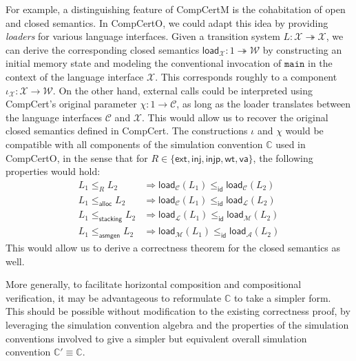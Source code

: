 \documentclass[11pt,oneside]{book}
\theoremstyle{definition}
\newcommand{\kw}[1]{\ensuremath{ \mathsf{#1} }}
\begin{document}
For example,
a distinguishing feature of CompCertM
is the cohabitation of open and closed semantics.
In CompCertO,
we could adapt this idea by providing
\emph{loaders} for various language interfaces.
Given a transition system $L : \mathcal{X} \twoheadrightarrow \mathcal{X}$,
we can derive the corresponding closed semantics
$\kw{load}_\mathcal{X} : 1 \twoheadrightarrow \mathcal{W}$
by constructing an initial memory state
and modeling the conventional invocation of $\texttt{main}$
in the context of the language interface $\mathcal{X}$.
This corresponds roughly to a component
$\iota_\mathcal{X} : \mathcal{X} \rightarrow \mathcal{W}$.
On the other hand,
external calls could be interpreted using
CompCert's original parameter
$\chi : 1 \rightarrow \mathcal{C}$,
as long as the loader translates
between the language interfaces $\mathcal{C}$ and $\mathcal{X}$.
This would allow us to recover
the original closed semantics defined in CompCert.
The constructions $\iota$ and $\chi$ would be compatible
with all components of the simulation convention $\mathbb{C}$
used in CompCertO,
in the sense that
for $R \in \{ \kw{ext}, \kw{inj}, \kw{injp}, \kw{wt}, \kw{va} \}$,
the following properties would hold:
\begin{align*}
  L_1 \le_R L_2 &\Rightarrow
    \kw{load}_\mathcal{C}(L_1) \le_\kw{id} \kw{load}_\mathcal{C}(L_2) \\
  L_1 \le_\kw{alloc} L_2 &\Rightarrow
    \kw{load}_\mathcal{C}(L_1) \le_\kw{id} \kw{load}_\mathcal{L}(L_2) \\
  L_1 \le_\kw{stacking} L_2 &\Rightarrow
    \kw{load}_\mathcal{L}(L_1) \le_\kw{id} \kw{load}_\mathcal{M}(L_2) \\
  L_1 \le_\kw{asmgen} L_2 &\Rightarrow
    \kw{load}_\mathcal{M}(L_1) \le_\kw{id} \kw{load}_\mathcal{A}(L_2)
\end{align*}
This would allow us to derive a correctness theorem
for the closed semantics as well.

More generally,
to facilitate horizontal composition
and compositional verification,
it may be advantageous to reformulate
$\mathbb{C}$
to take a simpler form.
This should be possible without
modification to the existing correctness proof,
by leveraging the simulation convention algebra
and the properties of the simulation conventions involved
to give a simpler but equivalent
overall simulation convention $\mathbb{C}' \equiv \mathbb{C}$.
\end{document}

